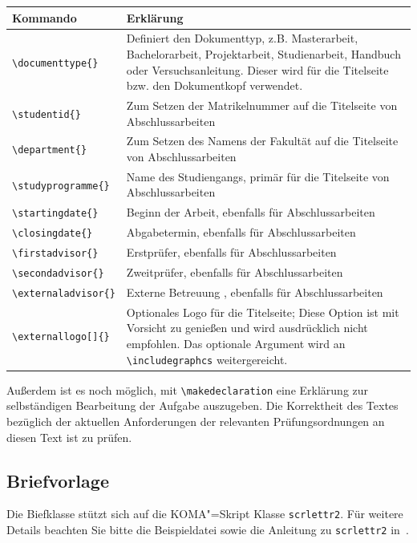 \documentclass[
paper=a4,
DIV=11,
fontsize=12pt,
twoside=true,
parskip=half-,
department=FakS,
logostyle=flat
]{OTHRartcl}
\begin{document}
\begin{center}
\begin{tabularx}{.9\linewidth}{lX}\toprule
\textbf{Kommando} & \textbf{Erklärung} \\\midrule
\verb+\documenttype{}+ & Definiert den Dokumenttyp, z.B. Masterarbeit, Bachelorarbeit, Projektarbeit, Studienarbeit, Handbuch oder Versuchsanleitung.
Dieser wird für die Titelseite bzw. den Dokumentkopf verwendet.\\
\verb+\studentid{}+ & Zum Setzen der Matrikelnummer auf die Titelseite von Abschlussarbeiten\\
\verb+\department{}+ & Zum Setzen des Namens der Fakultät auf die Titelseite von Abschlussarbeiten\\
\verb+\studyprogramme{}+ & Name des Studiengangs, primär für die Titelseite von Abschlussarbeiten\\
\verb+\startingdate{}+ & Beginn der Arbeit, ebenfalls für Abschlussarbeiten\\
\verb+\closingdate{}+ & Abgabetermin, ebenfalls für Abschlussarbeiten\\
\verb+\firstadvisor{}+ & Erstprüfer, ebenfalls für Abschlussarbeiten\\
\verb+\secondadvisor{}+ & Zweitprüfer, ebenfalls für Abschlussarbeiten\\
\verb+\externaladvisor{}+ & Externe Betreuung , ebenfalls für Abschlussarbeiten\\
\verb+\externallogo[]{}+ & Optionales Logo für die Titelseite; Diese Option ist mit Vorsicht zu genießen und wird ausdrücklich nicht empfohlen. Das optionale Argument wird an \verb|\includegraphcs| weitergereicht.\\
\bottomrule
\end{tabularx}
\end{center}
Außerdem ist es noch möglich, mit \verb|\makedeclaration| eine Erklärung zur selbständigen Bearbeitung der Aufgabe auszugeben.
Die Korrektheit des Textes bezüglich der aktuellen Anforderungen der relevanten  Prüfungsordnungen an diesen Text ist zu prüfen.

\subsection{Briefvorlage}

Die Biefklasse stützt sich auf die KOMA"=Skript Klasse \verb|scrlettr2|.
Für weitere Details beachten Sie bitte die Beispieldatei sowie die Anleitung zu \verb|scrlettr2| in~\cite{KOMA}.
\end{document}
